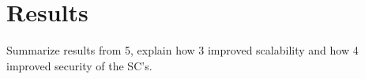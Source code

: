 \chapter{Results}\label{ch:results}
Summarize results from 5, explain how 3 improved scalability and how 4 improved security of the SC's.